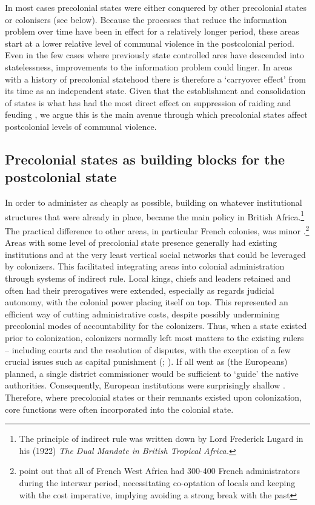 In most cases precolonial states were either conquered by other precolonial
states or colonisers (see below). Because the processes that reduce the
information problem over time have been in effect for a relatively longer
period, these areas start at a lower relative level of communal violence in the
postcolonial period. Even in the few cases where previously state controlled
ares have descended into statelessness, improvements to the information problem
could linger. In areas with a history of precolonial statehood there is
therefore a `carryover effect' from its time as an independent state. Given that
the establishment and consolidation of states is what has had the most direct
effect on suppression of raiding and feuding \citep{Pinker2012}, we argue this
is the main avenue through which precolonial states affect postcolonial levels
of communal violence.

\subsection{Precolonial states as building blocks for the postcolonial state}
\label{Precolonial states as building blocks for the postcolonial state}

In order to administer as cheaply as possible, building on whatever
institutional structures that were already in place, became the main policy in
British Africa.\footnote{The principle of indirect rule was written down by Lord
	Frederick Lugard in his (1922) \textit{The Dual Mandate in British
	Tropical Africa.}} The practical difference to other areas, in
	particular French colonies, was minor
	\citep{boone2014property}.\footnote{\citet[31]{englebert2013inside}
		point out that all of French West Africa had 300-400 French
	administrators during the interwar period, necessitating co-optation of
locals and keeping with the cost imperative, implying avoiding a strong break
with the past} Areas with some level of precolonial state presence generally had
existing institutions and at the very least vertical social networks that could
be leveraged by colonizers. This facilitated integrating areas into colonial
administration through systems of indirect rule. Local kings, chiefs and leaders
retained and often had their prerogatives were extended, especially as regards
judicial autonomy, with the colonial power placing itself on top. This
represented an efficient way of cutting administrative costs, despite possibly
undermining precolonial modes of accountability \citep{mamdani1996citizen} for
the colonizers. Thus, when a state existed prior to colonization, colonizers
normally left most matters to the existing rulers -- including courts and the
resolution of disputes, with the exception of a few crucial issues such as
capital punishment (\citealp{boone2014property};
\citealp[30]{englebert2013inside}). If all went as (the Europeans) planned, a
single district commissioner would be sufficient to `guide' the native
authorities. Consequently, European institutions were surprisingly shallow
\citep[25]{englebert2013inside}. Therefore, where precolonial states or their
remnants existed upon colonization, core functions were often incorporated into
the colonial state.

